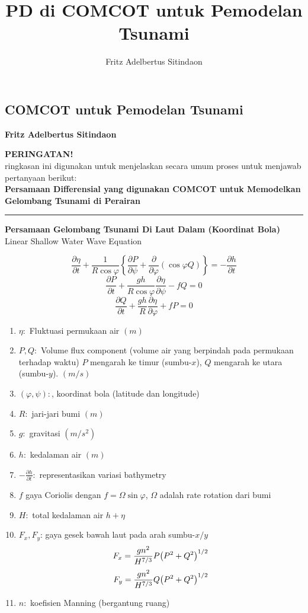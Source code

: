 \documentclass{article}
\title{PD di COMCOT untuk Pemodelan Tsunami}
\author{Fritz Adelbertus Sitindaon}
\date{}
\begin{document}
\begin{flushright}
    \section*{COMCOT untuk Pemodelan Tsunami}
    \textbf{Fritz Adelbertus Sitindaon}
\end{flushright}
\textbf{PERINGATAN!}\\
ringkasan ini digunakan untuk menjelaskan secara umum proses untuk menjawab pertanyaan berikut:\\
\textbf{Persamaan Differensial yang digunakan COMCOT untuk Memodelkan Gelombang Tsunami di Perairan}

\vspace{0.5cm}\hrule height 2pt\vspace{0.5cm}

\begin{center}
    \textbf{Persamaan Gelombang Tsunami Di Laut Dalam (Koordinat Bola)}
    \\Linear Shallow Water Wave Equation
\end{center}
\begin{equation}
    \frac{\partial \eta}{\partial t} + \frac{1}{R\cos \varphi}\left\{\frac{\partial P}{\partial \psi}+\frac{\partial}{\partial \varphi}(\cos \varphi Q)\right\} = -\frac{\partial h}{\partial t}
\end{equation}
\begin{equation}
    \frac{\partial P}{\partial t} + \frac{gh}{R\cos \varphi}\frac{\partial \eta}{\partial \psi}-fQ=0
\end{equation}
\begin{equation}
    \frac{\partial Q}{\partial t} + \frac{gh}{R}\frac{\partial \eta}{\partial\varphi}+fP=0
\end{equation}

\begin{enumerate}
    \item $\eta:$ Fluktuasi permukaan air $(m)$
    \item $P,Q:$ Volume flux component (volume air yang berpindah pada permukaan terhadap waktu)
    $P$ mengarah ke timur (sumbu-$x$), $Q$ mengarah ke utara (sumbu-$y$). $(m/s)$
    \item $(\varphi, \psi):$, koordinat bola (latitude dan longitude)
    \item $R:$ jari-jari bumi $(m)$
    \item $g:$ gravitasi $(m/s^2)$
    \item $h:$ kedalaman air $(m)$
    \item $-\frac{\partial h}{\partial t}:$ representasikan variasi bathymetry
    \item $f$ gaya Coriolis dengan $f=\Omega \sin\varphi$, $\Omega$ adalah rate rotation dari bumi
    \item $H:$ total kedalaman air $h+\eta$
    \item $F_x, F_y$: gaya gesek bawah laut pada arah sumbu-$x/y$
    \[
        F_x=\frac{gn^2}{H^{7/3}}P\oio*{P^2+Q^2}^{1/2}
    \]
    \[
        F_y=\frac{gn^2}{H^{7/3}}Q\oio*{P^2+Q^2}^{1/2}
    \]
    \item $n:$ koefisien Manning (bergantung ruang)
\end{enumerate}
\end{document}
